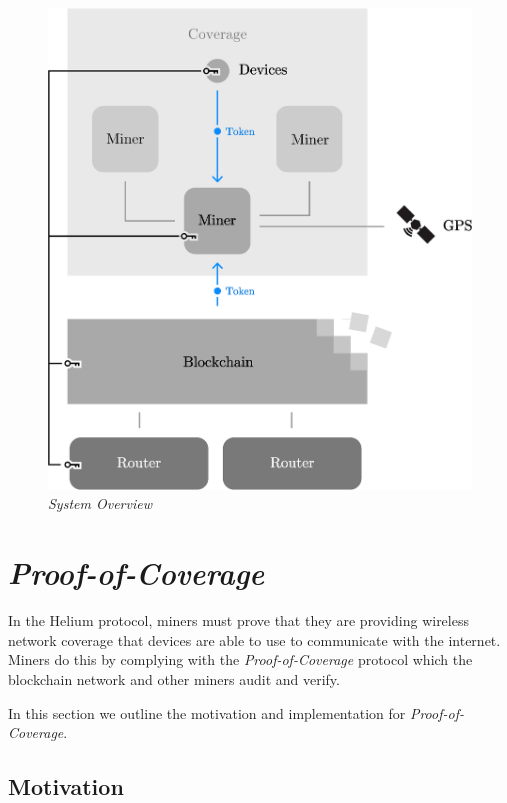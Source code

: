 \documentclass[letterpaper,11pt]{article}
\def\proofofcoverage/{\textit{Proof-of-Coverage}}
\begin{document}
\begin{figure}[H]
	\begin{center}
  		\includegraphics[width=\textwidth]{diagram1.eps}
  		\caption{\textit{System Overview}}
  		\label{fig:system}
 	\end{center}
\end{figure}

\newpage

\section{\proofofcoverage/} \label{poc}

In the Helium protocol, miners must prove that they are providing wireless network coverage that devices are able to use to communicate with the internet. Miners do this by complying with the \textit{Proof-of-Coverage} protocol which the blockchain network and other miners audit and verify.\newline

In this section we outline the motivation and implementation for \proofofcoverage/.

\subsection{Motivation}
\end{document}

